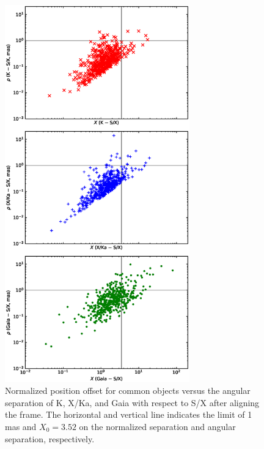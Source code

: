 \documentclass{aa}   %
\begin{document}
\begin{figure}[hbtp]
    \centering
    \includegraphics[width=80mm]{figs/rho-x-scatter-nosys}
    \caption[]{\label{fig:rho-x-scatter-nosys}
        Normalized position offset for common objects versus the angular separation of K, X/Ka, and Gaia with respect to S/X after aligning the frame.
        The horizontal and vertical line indicates the limit of 1\,mas and $X_0=3.52$ on the normalized separation and angular separation, respectively.
    }
\end{figure}
\end{document}
